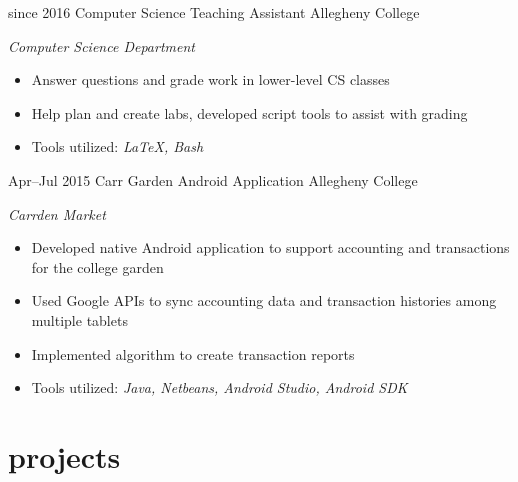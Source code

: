 \documentclass[]{friggeri-cv}
\begin{document}
\begin{entrylist}
  \entry
    {since 2016}
    {Computer Science Teaching Assistant}
    {Allegheny College}
    {\emph{Computer Science Department}
    \begin{itemize}[leftmargin=1.2em]
    \item Answer questions and grade work in lower-level CS classes
    \item Help plan and create labs, developed script tools to assist with grading
    \item Tools utilized: \emph{\LaTeX , Bash}
    \end{itemize}}
  \entry
    {Apr--Jul 2015}
    {Carr Garden Android Application}
    {Allegheny College}
    {\emph{Carrden Market}
    \begin{itemize}[leftmargin=1.2em]
    \item Developed native Android application to support accounting and transactions for the college garden
    \item Used Google APIs to sync accounting data and transaction histories among multiple tablets
    \item Implemented algorithm to create transaction reports
    \item Tools utilized: \emph{Java, Netbeans, Android Studio, Android SDK}
    \end{itemize}}
\end{entrylist}

\section{projects}
\end{document}
